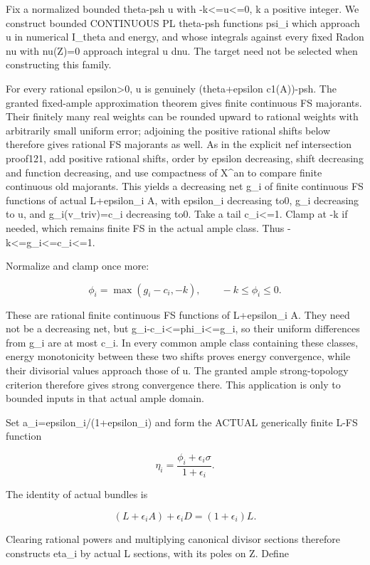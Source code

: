 \documentclass[
  10pt,
]{article}
\begin{document}
Fix a normalized bounded theta-psh u with -k\textless=u\textless=0, k a
positive integer. We construct bounded CONTINUOUS PL theta-psh functions
psi\_i which approach u in numerical I\_theta and energy, and whose
integrals against every fixed Radon nu with nu(Z)=0 approach integral u
dnu. The target need not be selected when constructing this family.

For every rational epsilon\textgreater0, u is genuinely (theta+epsilon
c1(A))-psh. The granted fixed-ample approximation theorem gives finite
continuous FS majorants. Their finitely many real weights can be rounded
upward to rational weights with arbitrarily small uniform error;
adjoining the positive rational shifts below therefore gives rational FS
majorants as well. As in the explicit nef intersection proof121, add
positive rational shifts, order by epsilon decreasing, shift decreasing
and function decreasing, and use compactness of X\^{}an to compare
finite continuous old majorants. This yields a decreasing net g\_i of
finite continuous FS functions of actual L+epsilon\_i A, with epsilon\_i
decreasing to0, g\_i decreasing to u, and g\_i(v\_triv)=c\_i decreasing
to0. Take a tail c\_i\textless=1. Clamp at -k if needed, which remains
finite FS in the actual ample class. Thus
-k\textless=g\_i\textless=c\_i\textless=1.

Normalize and clamp once more:

\[\phi_i=\max(g_i-c_i,-k),\qquad -k\leq\phi_i\leq0.\]

These are rational finite continuous FS functions of L+epsilon\_i A.
They need not be a decreasing net, but
g\_i-c\_i\textless=phi\_i\textless=g\_i, so their uniform differences
from g\_i are at most c\_i. In every common ample class containing these
classes, energy monotonicity between these two shifts proves energy
convergence, while their divisorial values approach those of u. The
granted ample strong-topology criterion therefore gives strong
convergence there. This application is only to bounded inputs in that
actual ample domain.

Set a\_i=epsilon\_i/(1+epsilon\_i) and form the ACTUAL generically
finite L-FS function

\[\eta_i=\frac{\phi_i+\epsilon_i\sigma}{1+\epsilon_i}.\]

The identity of actual bundles is

\[(L+\epsilon_i A)+\epsilon_i D=(1+\epsilon_i)L.\]

Clearing rational powers and multiplying canonical divisor sections
therefore constructs eta\_i by actual L sections, with its poles on Z.
Define
\end{document}
